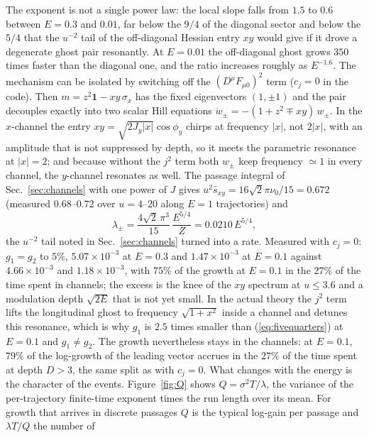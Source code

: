 \documentclass[11pt,a4paper]{article}
\begin{document}
The exponent is not a single power law: the local slope falls from $1.5$ to $0.6$ between
$E=0.3$ and $0.01$, far below the $9/4$ of the diagonal sector and below the $5/4$ that the
$u^{-2}$ tail of the off-diagonal Hessian entry $xy$ would give if it drove a degenerate ghost
pair resonantly. At $E=0.01$ the off-diagonal ghost grows $350$ times faster than the diagonal
one, and the ratio increases roughly as $E^{-1.6}$.
%
The mechanism can be isolated by switching off the $(D^\mu F_{\mu0})^2$ term ($c_j=0$ in the
code). Then $m=z^2\mathbf 1-xy\,\sigma_x$ has the fixed eigenvectors $(1,\pm1)$ and the pair
decouples exactly into two scalar Hill equations $\ddot w_\pm=-(1+z^2\mp xy)\,w_\pm$. In the
$x$-channel the entry $xy=\sqrt{2J_y|x|}\cos\phi_y$ chirps at frequency $|x|$, not $2|x|$, with an
amplitude that is not suppressed by depth, so it meets the parametric resonance at $|x|=2$; and
because without the $j^2$ term both $w_\pm$ keep frequency $\simeq1$ in every channel, the
$y$-channel resonates as well. The passage integral of Sec.~\ref{sec:channels} with one power of
$J$ gives $u^2\hat s_{xy}=16\sqrt2\pi\nu_0/15=0.672$ (measured $0.68$--$0.72$ over $u=4$--$20$
along $E=1$ trajectories) and
\begin{equation}
\lambda_\pm=\frac{4\sqrt2\,\pi^3}{15}\,\frac{E^{5/4}}{Z}=0.0210\,E^{5/4},
\label{eq:fivequarters}
\end{equation}
the $u^{-2}$ tail noted in Sec.~\ref{sec:channels} turned into a rate. Measured with $c_j=0$:
$g_1=g_2$ to $5\%$, $5.07\times10^{-3}$ at $E=0.3$ and $1.47\times10^{-3}$ at $E=0.1$ against
$4.66\times10^{-3}$ and $1.18\times10^{-3}$, with $75\%$ of the growth at $E=0.1$ in the $27\%$
of the time spent in channels; the excess is the knee of the $xy$ spectrum at $u\le3.6$ and a
modulation depth $\sqrt{2E}$ that is not yet small. In the actual theory the $j^2$ term lifts the longitudinal ghost to frequency $\sqrt{1+x^2}$
inside a channel and detunes this resonance, which is why $g_1$ is $2.5$ times smaller than
(\ref{eq:fivequarters}) at $E=0.1$ and $g_1\ne g_2$. The growth nevertheless stays in the
channels: at $E=0.1$, $79\%$ of the log-growth of the leading vector accrues in the $27\%$ of the
time spent at depth $D>3$, the same split as with $c_j=0$. What changes with the energy is the
character of the events. Figure~\ref{fig:Q} shows $Q=\sigma^2T/\lambda$, the variance of the
per-trajectory finite-time exponent times the run length over its mean. For growth that arrives
in discrete passages $Q$ is the typical log-gain per passage and $\lambda T/Q$ the number of
\end{document}
